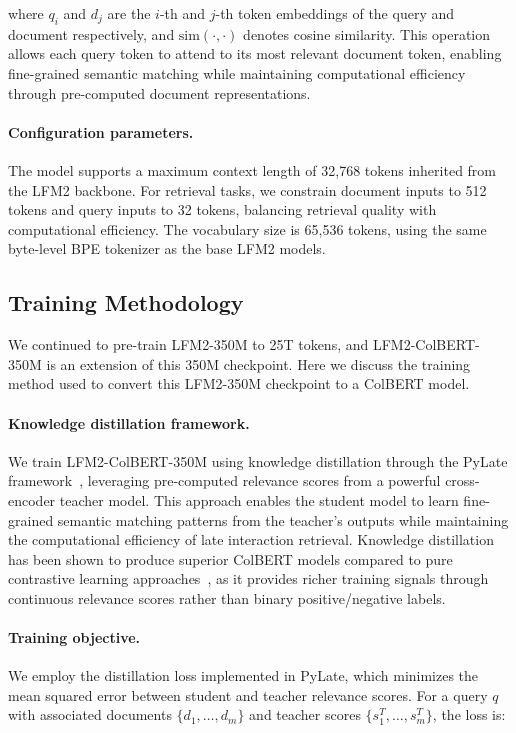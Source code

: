 \documentclass{article}
\begin{document}
where $q_i$ and $d_j$ are the $i$-th and $j$-th token embeddings of the query and document respectively, and $\text{sim}(\cdot, \cdot)$ denotes cosine similarity. This operation allows each query token to attend to its most relevant document token, enabling fine-grained semantic matching while maintaining computational efficiency through pre-computed document representations.

\paragraph{Configuration parameters.}
The model supports a maximum context length of 32,768 tokens inherited from the LFM2 backbone. For retrieval tasks, we constrain document inputs to 512 tokens and query inputs to 32 tokens, balancing retrieval quality with computational efficiency. The vocabulary size is 65,536 tokens, using the same byte-level BPE tokenizer as the base LFM2 models.

\subsection{Training Methodology}

We continued to pre-train LFM2-350M to 25T tokens, and LFM2-ColBERT-350M is an extension of this 350M checkpoint. Here we discuss the training method used to convert this LFM2-350M checkpoint to a ColBERT model.

\paragraph{Knowledge distillation framework.}
We train LFM2-ColBERT-350M using knowledge distillation through the PyLate framework~\citep{chaffin2024pylate}, leveraging pre-computed relevance scores from a powerful cross-encoder teacher model. This approach enables the student model to learn fine-grained semantic matching patterns from the teacher's outputs while maintaining the computational efficiency of late interaction retrieval. Knowledge distillation has been shown to produce superior ColBERT models compared to pure contrastive learning approaches~\citep{khattab2020colbert}, as it provides richer training signals through continuous relevance scores rather than binary positive/negative labels.

\paragraph{Training objective.}
We employ the distillation loss implemented in PyLate, which minimizes the mean squared error between student and teacher relevance scores. For a query $q$ with associated documents $\{d_1, \ldots, d_m\}$ and teacher scores $\{s_1^T, \ldots, s_m^T\}$, the loss is:
\end{document}
